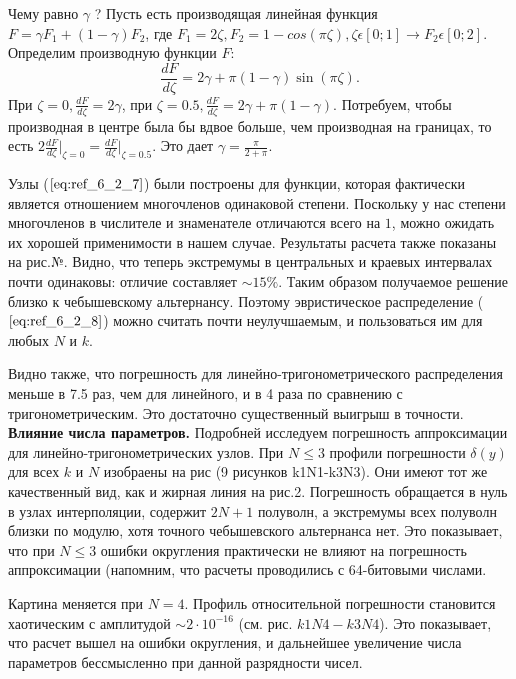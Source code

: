 Чему равно $\gamma$ ? Пусть есть производящая линейная функция
$F = \gamma F_1 + (1-\gamma)F_2$, где $F_1 = 2\zeta, F_2 = 1 - cos(\pi \zeta), \zeta \epsilon [0;1] \to F_2 \epsilon [0;2]$. Определим производную функции $F$:
\begin{equation}
\frac{dF}{d\zeta} = 2\gamma + \pi (1-\gamma)\sin(\pi \zeta).
\end{equation}
При $\zeta = 0, \frac{dF}{d\zeta} = 2\gamma$, при $\zeta = 0.5, \frac{dF}{d\zeta} = 2\gamma + \pi (1-\gamma)$. Потребуем, чтобы производная в центре была бы вдвое больше, чем производная на границах, то есть $2\frac{dF}{d\zeta}\Bigg|_{\zeta=0} = \frac{dF}{d\zeta}\Bigg|_{\zeta=0.5}$. Это дает $\gamma = \frac{\pi}{2+\pi}$.

Узлы ($\ref{eq:ref_6_2_7}$) были построены для функции, которая фактически является
отношением многочленов одинаковой степени. Поскольку у нас степени
многочленов в числителе и знаменателе отличаются всего на $1$, можно ожидать их хорошей применимости в нашем случае. Результаты расчета также
показаны на рис.№. Видно, что теперь экстремумы в центральных и краевых
интервалах почти одинаковы: отличие составляет $\sim 15\%$. Таким образом получаемое решение близко к чебышевскому альтернансу. Поэтому эвристическое распределение ($\ref{eq:ref_6_2_8}$) можно считать почти неулучшаемым, и пользоваться им для любых $N$ и $k$.

Видно также, что погрешность для линейно-тригонометрического распределения меньше в 7.5 раз, чем для линейного, и в 4 раза по сравнению с тригонометрическим. Это достаточно существенный выигрыш в точности.
\\

\textbf{Влияние числа параметров.} Подробней исследуем погрешность аппроксимации для линейно-тригонометрических узлов. При $N \leqslant 3$ профили погрешности $\delta(y)$ для всех $k$ и $N$ изобраены на рис (9 рисунков k1N1-k3N3).
Они имеют тот же качественный вид, как и жирная линия на рис.2. Погрешность
обращается в нуль в узлах интерполяции, содержит $2N+1$ полуволн, а экстремумы всех полуволн близки по модулю, хотя точного чебышевского альтернанса нет. Это показывает, что при $N \leqslant 3$ ошибки округления практически не влияют на погрешность аппроксимации (напомним, что расчеты проводились с 64-битовыми числами.

Картина меняется при $N = 4$. Профиль относительной погрешности становится хаотическим с 
амплитудой $\sim  2 \cdot 10^{-16}$ (см. рис. $k1N4-k3N4$). Это показывает, что
расчет вышел на ошибки округления, и дальнейшее увеличение числа параметров бессмысленно при данной 
разрядности чисел.

